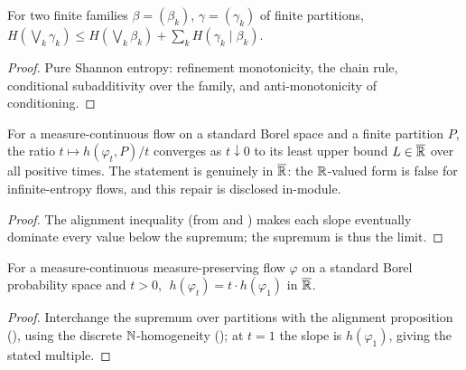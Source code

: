 \begin{theorem}\label{thm:flow-finJoin}
  \leanok
  For two finite families $\beta = (\beta_k)$, $\gamma = (\gamma_k)$ of finite partitions,
  $H\!\left(\bigvee_k \gamma_k\right) \le H\!\left(\bigvee_k \beta_k\right)
  + \sum_k H(\gamma_k \mid \beta_k)$.
\end{theorem}
\begin{proof}\leanok
  Pure Shannon entropy: refinement monotonicity, the chain rule, conditional subadditivity over the
  family, and anti-monotonicity of conditioning.
\end{proof}

\begin{theorem}\label{thm:flow-ratioLUB}
  \leanok
  For a measure-continuous flow on a standard Borel space and a finite partition $P$, the ratio
  $t \mapsto h(\varphi_t, P)/t$ converges as $t \downarrow 0$ to its least upper bound
  $L \in \overline{\mathbb{R}}$ over all positive times. The statement is genuinely in $\overline{\mathbb{R}}$: the
  $\mathbb{R}$-valued form is false for infinite-entropy flows, and this repair is disclosed in-module.
\end{theorem}
\begin{proof}\leanok
  The alignment inequality (from  and ) makes each slope
  eventually dominate every value below the supremum; the supremum is thus the limit.
\end{proof}

\begin{theorem}\label{thm:flow-abramov-hom}
  \leanok
  For a measure-continuous measure-preserving flow $\varphi$ on a standard Borel probability space
  and $t > 0$, $\;h(\varphi_t) = t \cdot h(\varphi_1)$ in $\overline{\mathbb{R}}$.
\end{theorem}
\begin{proof}\leanok
  Interchange the supremum over partitions with the alignment proposition
  (), using the discrete $\mathbb{N}$-homogeneity (); at
  $t = 1$ the slope is $h(\varphi_1)$, giving the stated multiple.
\end{proof}

